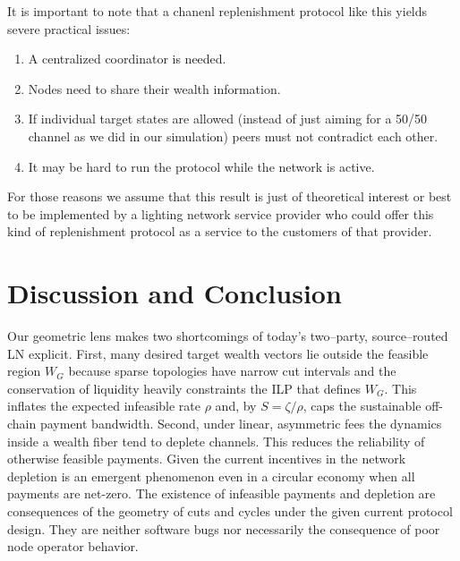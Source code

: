 \documentclass[10pt,twocolumn]{article}
\begin{document}
It is important to note that a chanenl replenishment protocol like this yields severe practical issues:
\begin{enumerate}
\item A centralized coordinator is needed.
\item Nodes need to share their wealth information.
\item If individual target states are allowed (instead of just aiming for a 50/50 channel as we did in our simulation) peers must not contradict each other.
  \item It may be hard to run the protocol while the network is active.
\end{enumerate}
For those reasons we assume that this result is just of theoretical interest or best to be implemented by a lighting network service provider who could offer this kind of replenishment protocol as a service to the customers of that provider. 




\section{Discussion and Conclusion}

Our geometric lens makes two shortcomings of today’s two–party, source–routed LN explicit. First, many desired target wealth vectors lie outside the feasible region $W_G$ because sparse topologies have narrow cut intervals and the conservation of liquidity heavily constraints the ILP that defines $W_G$. This inflates the expected infeasible rate $\rho$ and, by $S=\zeta/\rho$, caps the sustainable off-chain payment bandwidth. Second, under linear, asymmetric fees the dynamics inside a wealth fiber tend to deplete channels. This reduces the reliability of otherwise feasible payments. Given the current incentives in the network depletion is an emergent phenomenon even in a circular economy when all payments are net-zero. The existence of infeasible payments and depletion are consequences of the geometry of cuts and cycles under the given current protocol design. They are neither software bugs nor necessarily the consequence of poor node operator behavior. 
\end{document}
